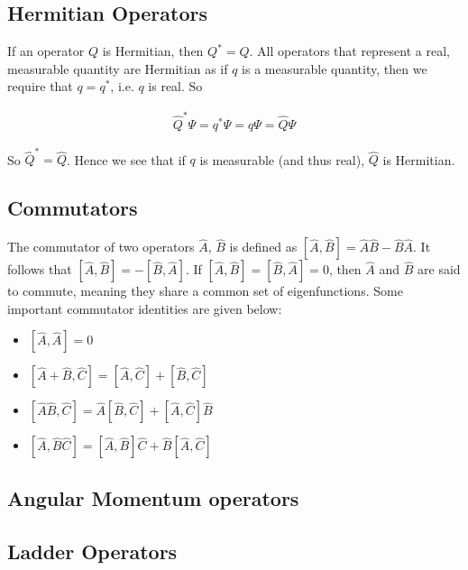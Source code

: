 \subsection{Hermitian Operators}

If an operator $Q$ is Hermitian, then $Q^* = Q$. All operators that represent a real, measurable quantity are Hermitian as if $q$ is a measurable quantity, then we require that $q = q^*$, i.e. $q$ is real. So

\begin{align*}
\hat{Q}^*\Psi = q^*\Psi = q\Psi = \hat{Q}\Psi
\end{align*}

So $\hat{Q}^* = \hat{Q}$. Hence we see that if $q$ is measurable (and thus real), $\hat{Q}$ is Hermitian.


\subsection{Commutators}

The commutator of two operators $\hat{A}$, $\hat{B}$ is defined as $[\hat{A},\hat{B}] = \hat{A}\hat{B} - \hat{B}\hat{A}$. It follows that $[\hat{A},\hat{B}] = -[\hat{B},\hat{A}]$. If $[\hat{A},\hat{B}] =[\hat{B},\hat{A}] = 0$, then $\hat{A}$ and $\hat{B}$ are said to commute, meaning they share a common set of eigenfunctions.  Some important commutator identities are given below:

\begin{itemize}
	\item $[\hat{A},\hat{A}] = 0$
	\item $[\hat{A} + \hat{B}, \hat{C}] = [\hat{A},\hat{C}] + [\hat{B},\hat{C}]$
	\item $[\hat{A}\hat{B},\hat{C}] = \hat{A}[\hat{B},\hat{C}] + [\hat{A},\hat{C}]\hat{B}$
	\item $[\hat{A},\hat{B}\hat{C}] = [\hat{A},\hat{B}]\hat{C} + \hat{B}[\hat{A},\hat{C}]$
\end{itemize}

\subsection{Angular Momentum operators}
\subsection{Ladder Operators}